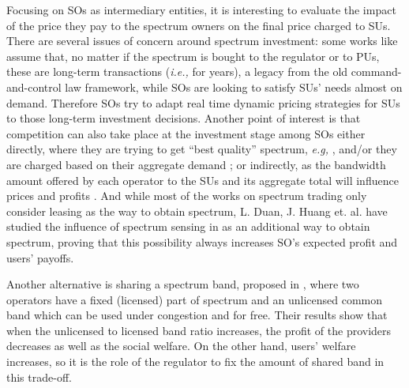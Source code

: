 Focusing on SOs as intermediary entities, it is interesting to evaluate the impact of the price they pay to the spectrum owners on the final price charged to SUs. There are several issues of concern around spectrum investment: some works like \cite{ref:Jia2008_com} assume that, no matter if the spectrum is bought to the regulator or to PUs, these are long-term transactions (\textit{i.e.,} for years), a legacy from the old command-and-control law framework, while SOs are looking to satisfy SUs' needs almost on demand. Therefore SOs try to adapt real time dynamic pricing strategies for SUs to those long-term investment decisions. Another point of interest is that competition can also take place at the investment stage among SOs either directly, where they are trying to get ``best quality'' spectrum, \textit{e.g,} \cite{ref:Kim2011}, and/or they are charged based on their aggregate demand \cite{ref:Jia2008_com}; or indirectly, as the bandwidth amount offered by each operator to the SUs and its aggregate total will influence prices and profits \cite{ref:Duan2010_Comp}. And while most of the works on spectrum trading only consider leasing as the way to obtain spectrum, L. Duan, J. Huang et. al. have studied the influence of spectrum sensing in \cite{ref:Duan2010_Cog,ref:Duan2011_Inves} as an additional way to obtain spectrum, proving that this possibility always increases SO's expected profit and users' payoffs. 

Another alternative is sharing a spectrum band, proposed in \cite{ref:Maille2009}, where two operators have a fixed (licensed) part of spectrum and an unlicensed common band which can be used under congestion and for free. Their results show that when the unlicensed to licensed band ratio increases, the profit of the providers decreases as well as the social welfare. On the other hand, users' welfare increases, so it is the role of the regulator to fix the amount of shared band in this trade-off.

